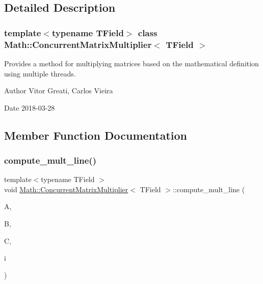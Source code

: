 \subsection{Detailed Description}
\subsubsection*{template$<$typename T\+Field$>$\newline
class Math\+::\+Concurrent\+Matrix\+Multiplier$<$ T\+Field $>$}

Provides a method for multiplying matrices based on the mathematical definition using multiple threads. 

\begin{DoxyAuthor}{Author}
Vitor Greati, Carlos Vieira 
\end{DoxyAuthor}
\begin{DoxyDate}{Date}
2018-\/03-\/28 
\end{DoxyDate}


\subsection{Member Function Documentation}
\mbox{\label{classMath_1_1ConcurrentMatrixMultiplier_ac6ab99958d957a7461819455a2114483}} 
\subsubsection{\texorpdfstring{compute\+\_\+mult\+\_\+line()}{compute\_mult\_line()}}
{\footnotesize\ttfamily template$<$typename T\+Field $>$ \\
void \mbox{\hyperlink{classMath_1_1ConcurrentMatrixMultiplier}{Math\+::\+Concurrent\+Matrix\+Multiplier}}$<$ T\+Field $>$\+::compute\+\_\+mult\+\_\+line (\begin{DoxyParamCaption}\item[{const \mbox{\hyperlink{classMath_1_1Matrix}{Matrix}}$<$ T\+Field $>$ \&}]{A,  }\item[{const \mbox{\hyperlink{classMath_1_1Matrix}{Matrix}}$<$ T\+Field $>$ \&}]{B,  }\item[{\mbox{\hyperlink{classMath_1_1Matrix}{Matrix}}$<$ T\+Field $>$ \&}]{C,  }\item[{const int \&}]{i }\end{DoxyParamCaption})\hspace{0.3cm}{\ttfamily [inline]}}



